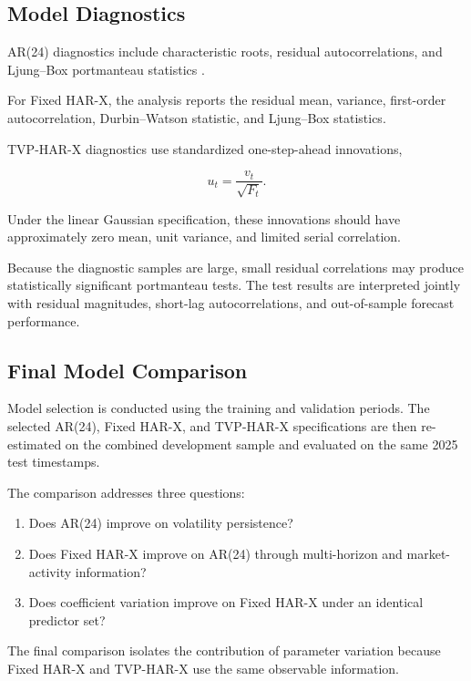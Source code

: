 \subsection{Model Diagnostics}

AR(24) diagnostics include characteristic roots, residual
autocorrelations, and Ljung--Box portmanteau statistics
\citep{ljungbox1978}.

For Fixed HAR-X, the analysis reports the residual mean,
variance, first-order autocorrelation, Durbin--Watson
statistic, and Ljung--Box statistics.

TVP-HAR-X diagnostics use standardized one-step-ahead
innovations,

\begin{equation}
u_t
=
\frac{v_t}{\sqrt{F_t}}.
\label{eq:standardized-innovation}
\end{equation}

Under the linear Gaussian specification, these innovations
should have approximately zero mean, unit variance, and limited
serial correlation.

Because the diagnostic samples are large, small residual
correlations may produce statistically significant
portmanteau tests. The test results are interpreted jointly
with residual magnitudes, short-lag autocorrelations, and
out-of-sample forecast performance.

\subsection{Final Model Comparison}

Model selection is conducted using the training and validation
periods. The selected AR(24), Fixed HAR-X, and TVP-HAR-X
specifications are then re-estimated on the combined
development sample and evaluated on the same 2025 test
timestamps.

The comparison addresses three questions:

\begin{enumerate}[label=(\arabic*)]
    \item Does AR(24) improve on volatility persistence?
    \item Does Fixed HAR-X improve on AR(24) through
    multi-horizon and market-activity information?
    \item Does coefficient variation improve on Fixed HAR-X
    under an identical predictor set?
\end{enumerate}

The final comparison isolates the contribution of parameter
variation because Fixed HAR-X and TVP-HAR-X use the same
observable information.